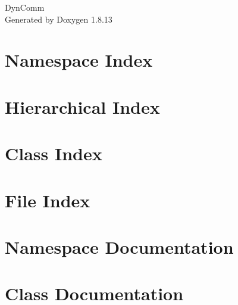 \documentclass[twoside]{book}
\newcommand{\+}{\discretionary{\mbox{\scriptsize$\hookleftarrow$}}{}{}}
\newcommand{\clearemptydoublepage}{%
  \newpage{\pagestyle{empty}\cleardoublepage}%
}
\begin{document}
\hypersetup{pageanchor=false,
             bookmarksnumbered=true,
             pdfencoding=unicode
            }
\begin{titlepage}
\vspace*{7cm}
\begin{center}%
{\Large Dyn\+Comm }\\
\vspace*{1cm}
{\large Generated by Doxygen 1.8.13}\\
\end{center}
\end{titlepage}
\clearemptydoublepage
{}
\tableofcontents
\clearemptydoublepage
{}
\hypersetup{pageanchor=true}

\chapter{Namespace Index}

\chapter{Hierarchical Index}

\chapter{Class Index}

\chapter{File Index}

\chapter{Namespace Documentation}




\chapter{Class Documentation}

































\end{document}

